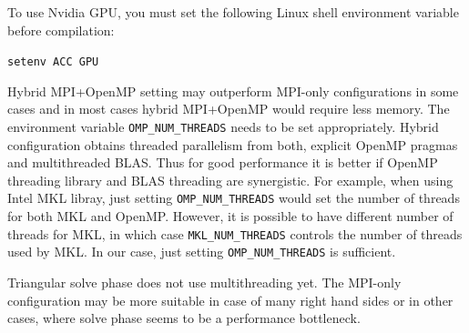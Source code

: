 To use Nvidia GPU, you must set the following
Linux shell environment variable before compilation:

\vspace{.1in}
{\tt setenv ACC GPU}
\vspace{.1in}

Hybrid MPI+OpenMP setting may outperform MPI-only configurations in some
cases and in most cases hybrid MPI+OpenMP would require less memory.
The environment variable {\tt OMP\_NUM\_THREADS} needs to be set appropriately.
Hybrid configuration obtains threaded parallelism from both,
explicit OpenMP pragmas and multithreaded BLAS. Thus for good performance
it is better if OpenMP threading library and BLAS threading are synergistic.
For example, when using Intel MKL libray, just setting {\tt OMP\_NUM\_THREADS}
would set the number of threads for both MKL and OpenMP. However,
it is possible to have different number of threads for MKL, in which case
{\tt MKL\_NUM\_THREADS} controls the number of threads used by MKL. 
In our case, just setting {\tt OMP\_NUM\_THREADS} is sufficient. 

Triangular solve phase does not use multithreading yet.
The MPI-only configuration may be more suitable in case of
many right hand sides or in other cases, where solve phase seems
to be a performance bottleneck.


